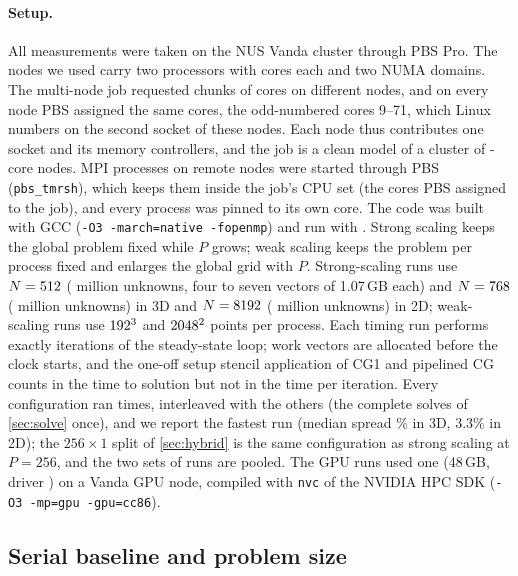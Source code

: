 \documentclass[10pt,a4paper]{article}
\newcommand{\code}[1]{\texttt{#1}}
\begin{document}
\paragraph{Setup.}
All measurements were taken on the NUS Vanda cluster through PBS Pro. The nodes we used carry two
\MachineCPU{} processors with \MachineCPS{} cores each and two NUMA domains. The multi-node job
requested \MachineNodes{} chunks of \MachineCPN{} cores on \MachineNodes{} different nodes, and on every node
PBS assigned the same \MachineCPN{} cores, the odd-numbered cores 9--71, which Linux numbers on the second
socket of these nodes. Each node thus contributes one socket and its memory controllers, and the job is a
clean model of a cluster of \MachineCPN-core nodes. MPI processes on remote
nodes were started through PBS (\code{pbs\_tmrsh}), which keeps them inside the job's CPU set (the cores PBS assigned to the job), and every
process was pinned to its own core. The code was built with GCC \MachineGCC{} (\code{-O3 -march=native
-fopenmp}) and run with \MachineMPI. Strong scaling keeps the global problem fixed while $P$ grows; weak scaling keeps the problem
per process fixed and enlarges the global grid with $P$. Strong-scaling runs use $N=512$ (\NSdofs{}
million unknowns, four to seven vectors of 1.07\,GB each) and $N=768$ (\NStwoDofs{} million
unknowns) in 3D and $N=8192$ (\TwoDofs{} million unknowns) in 2D; weak-scaling runs use
$192^3$ and $2048^2$ points per process. Each timing run performs exactly \Iters{} iterations of the steady-state
loop; work vectors are allocated before the clock starts, and the one-off setup stencil application of CG1
and pipelined CG counts in the time to solution but not in the time per iteration. Every configuration ran
\Reps{} times, interleaved with the others (the complete solves of \cref{sec:solve} once), and we report the fastest run (median spread
\MedSpread\% in 3D, 3.3\% in 2D); the $256\times1$ split of \cref{sec:hybrid} is the same configuration as strong scaling at
$P=256$, and the two sets of runs are pooled. The GPU runs used one \GpuName{} (48\,GB, driver \GpuDriver) on a Vanda GPU node,
compiled with \code{nvc} \GpuNVC{} of the NVIDIA HPC SDK (\code{-O3 -mp=gpu -gpu=cc86}).

\subsection{Serial baseline and problem size}\label{sec:serial}
\end{document}
